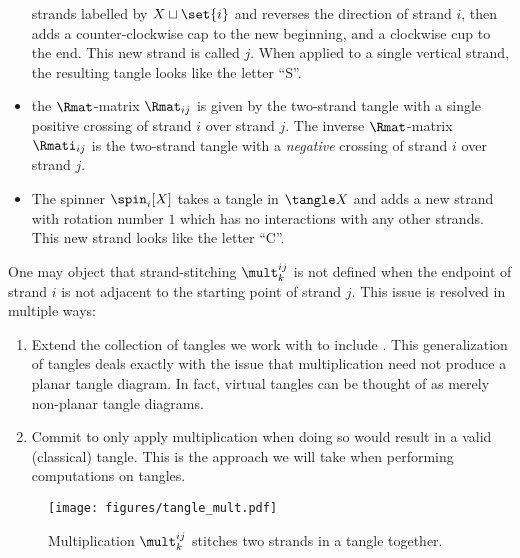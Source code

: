 \begin{theorem}
\begin{itemize}
                        strands labelled by $X \sqcup \set{i}$ and reverses the
                        direction of strand $i$, then adds a counter-clockwise
                        cap to the new beginning, and a clockwise cup to the
                        end. This new strand is called $j$. When applied to a
                        single vertical strand, the resulting tangle looks like
                        the letter \enquote{S}.
                \item the $\Rmat$-matrix $\Rmat_{ij}$ is given by the two-strand
                        tangle with a single positive crossing of strand $i$
                        over strand $j$. The inverse $\Rmat$-matrix
                        $\Rmati_{ij}$ is the two-strand tangle with a
                        \emph{negative} crossing of strand $i$ over strand $j$.
                \item The spinner $\spin_i[X]$ takes a tangle in $\tangle X$ and
                        adds a new strand with rotation number $1$ which has no
                        interactions with any other strands. This new strand
                        looks like the letter \enquote{C}.
        \end{itemize}
\end{theorem}
\begin{remark}\label{rem:virtual_caveat}
        One may object that strand-stitching $\mult^{ij}_k$ is not defined when
        the endpoint of strand $i$ is not adjacent to the starting point of
        strand $j$. This issue is resolved in multiple ways:
        \begin{enumerate}
                \item Extend the collection of tangles we work with to include
                        . This generalization of tangles
                        deals exactly with the issue that multiplication need
                        not produce a planar tangle diagram. In fact, virtual
                        tangles can be thought of as merely non-planar tangle
                        diagrams.
                \item Commit to only apply multiplication when doing so would
                        result in a valid (classical) tangle. This is the
                        approach we will take when performing computations on
                        tangles.
        \end{enumerate}
\end{remark}
\begin{figure}[h]
        \centering
        \texttt{[image: figures/tangle\_mult.pdf]}
        \caption{
                Multiplication $\mult^{ij}_{k}$ stitches two strands in a tangle
                together.
        }
        \label{fig:tangle_mult}
\end{figure}
